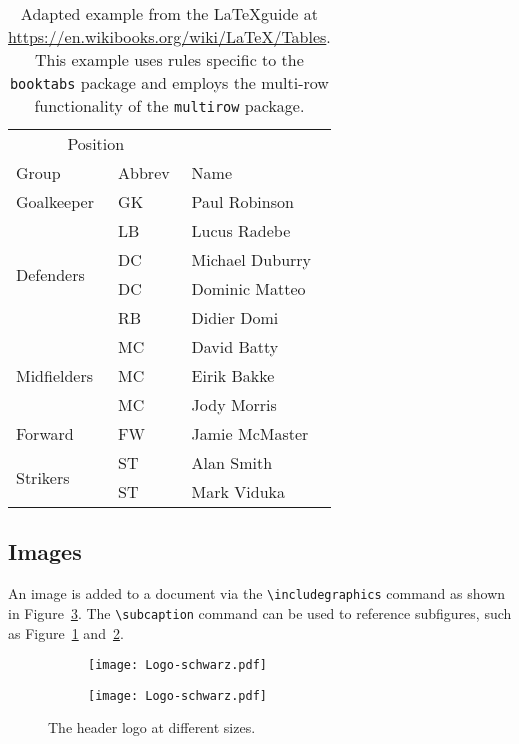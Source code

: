 \begin{table}[h] %
  \centering
  \begin{tabular}{lll}
    \toprule
    \multicolumn{2}{c}{Position} \\
    \cmidrule{1-2} %
    Group & Abbrev & Name \\
    \midrule
    Goalkeeper & GK & Paul Robinson \\
    \midrule
    \multirow{4}{*}{Defenders} & LB & Lucus Radebe \\
                               & DC & Michael Duburry \\
                               & DC & Dominic Matteo \\
                               & RB & Didier Domi \\
    \midrule
    \multirow{3}{*}{Midfielders} & MC & David Batty \\
                                 & MC & Eirik Bakke \\
                                 & MC & Jody Morris \\
    \midrule
    Forward & FW & Jamie McMaster \\
    \midrule
    \multirow{2}{*}{Strikers} & ST & Alan Smith \\
                              & ST & Mark Viduka \\
    \bottomrule
  \end{tabular}
  \caption{Adapted example from the \LaTeX guide at \url{https://en.wikibooks.org/wiki/LaTeX/Tables}. This example uses rules specific to the \texttt{booktabs} package and employs the multi-row functionality of the \texttt{multirow} package.}
  \label{tab:intro} %
\end{table}

\subsection{Images}

An image is added to a document via the \verb|\includegraphics| command as shown in Figure~\ref{fig:intro}.
The \verb|\subcaption| command can be used to reference subfigures, such as Figure~\ref{fig:intro:full width} and~\ref{fig:intro:half width}.

\begin{figure}[h]
  \centering
  \begin{subfigure}[b]{0.45\columnwidth}
    \centering
    \texttt{[image: Logo-schwarz.pdf]}
    \label{fig:intro:full width}
  \end{subfigure}
  \begin{subfigure}[b]{0.45\columnwidth}
    \centering
    \texttt{[image: Logo-schwarz.pdf]}
    \label{fig:intro:half width}
  \end{subfigure}
  \caption{The header logo at different sizes.}
  \label{fig:intro} %
\end{figure}

